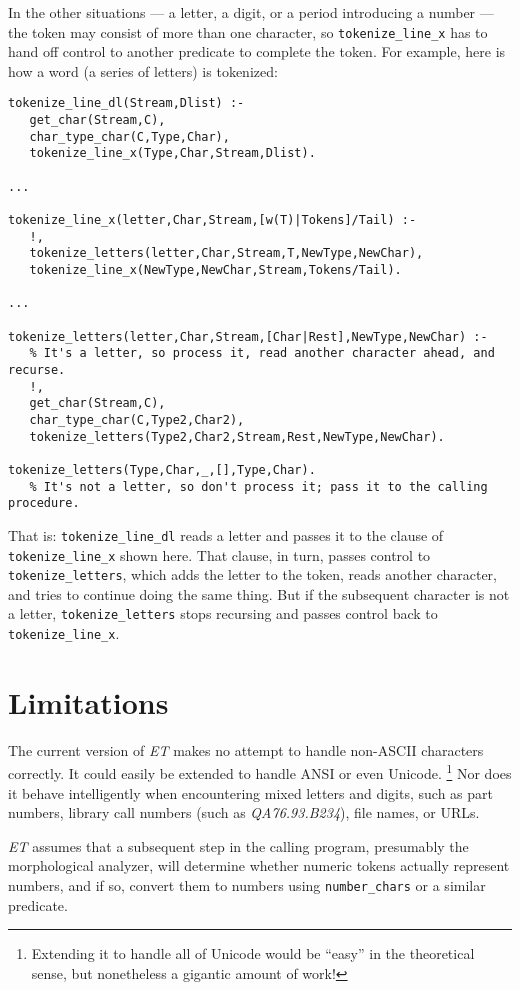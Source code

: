 \documentclass[12pt]{article}
\begin{document}
In the other situations --- a letter, a digit, or a period introducing a number --- the
token may consist of more than one character, so \verb"tokenize_line_x" has to hand off
control to another predicate to complete the token.
For example, here is how a word (a series of letters) is tokenized:
\begin{verbatim}
tokenize_line_dl(Stream,Dlist) :-
   get_char(Stream,C),                            
   char_type_char(C,Type,Char),
   tokenize_line_x(Type,Char,Stream,Dlist).

...

tokenize_line_x(letter,Char,Stream,[w(T)|Tokens]/Tail) :-
   !,
   tokenize_letters(letter,Char,Stream,T,NewType,NewChar),
   tokenize_line_x(NewType,NewChar,Stream,Tokens/Tail).

...

tokenize_letters(letter,Char,Stream,[Char|Rest],NewType,NewChar) :-
   % It's a letter, so process it, read another character ahead, and recurse.
   !,
   get_char(Stream,C),
   char_type_char(C,Type2,Char2),
   tokenize_letters(Type2,Char2,Stream,Rest,NewType,NewChar).

tokenize_letters(Type,Char,_,[],Type,Char).
   % It's not a letter, so don't process it; pass it to the calling procedure.
\end{verbatim}
That is: \verb"tokenize_line_dl" reads a letter and passes it to the clause
of \verb"tokenize_line_x" shown here.
That clause, in turn, passes control to \verb"tokenize_letters", which adds
the letter to the token, reads another character, and tries to continue doing
the same thing.
But if the subsequent character is not a letter,
\verb"tokenize_letters" stops recursing and passes control
back to \verb"tokenize_line_x".

\section{Limitations}

The current version of \emph{ET} makes no attempt to handle non-ASCII characters
correctly.
It could easily be extended to handle ANSI or even Unicode.%
\footnote{Extending it to handle all
of Unicode would be ``easy'' in the theoretical sense,
but nonetheless a gigantic amount of work!}
Nor does it behave intelligently when encountering mixed letters and digits,
such as part numbers, library call numbers (such as \emph{QA76.93.B234}),
file names, or URLs.

\emph{ET} assumes that a subsequent step in the calling program, presumably the morphological
analyzer, will determine whether numeric tokens actually represent numbers, and if so,
convert them to numbers using \verb"number_chars" or a similar predicate.
\end{document}
